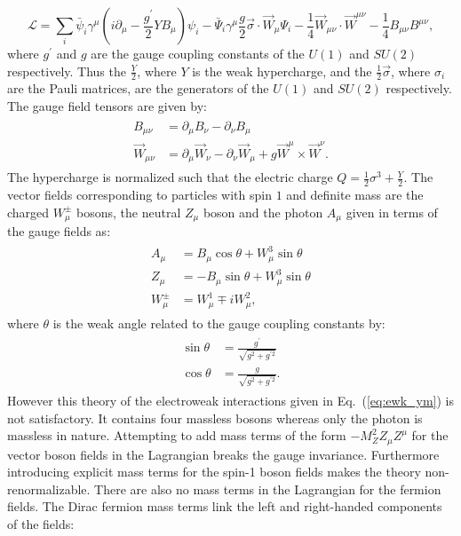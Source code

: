 \begin{equation} \label{eq:ewk_ym}
\mathcal{L} = \sum_{i} \bar{\psi}_{i} \gamma^{\mu}(i \partial_{\mu}-\frac{g^{'}}{2}YB_{\mu}) \psi_{i}  - \bar{\Psi}_{i}\gamma^{\mu}\frac{g}{2}\vec{\sigma}\cdot\vec{W}_{\mu}\Psi_{i} - \frac{1}{4}\vec{W}_{\mu\nu}\cdot\vec{W}^{\mu\nu} - \frac{1}{4} B_{\mu\nu} B^{\mu\nu},
\end{equation}
where $g^{'}$ and $g$ are the gauge coupling constants of the $U(1)$ and $SU(2)$ respectively. Thus the $\frac{Y}{2}$, where $Y$ is the weak hypercharge, and the $\frac{1}{2}\vec{\sigma}$, where $\sigma_{i}$ are the Pauli matrices, are the generators of the $U(1)$ and $SU(2)$ respectively. The gauge field tensors are given by:
\begin{eqnarray} \label{eq:ewk_field}
\begin{aligned}
B_{\mu\nu} &= \partial_{\mu}B_{\nu}-\partial_{\nu}B_{\mu}  \\
\vec{W}_{\mu\nu} &=  \partial_{\mu}\vec{W}_{\nu}-\partial_{\nu}\vec{W}_{\mu} + g \vec{W}^{\mu} \times \vec{W}^{\nu}.
\end{aligned}
\end{eqnarray}
The hypercharge is normalized such that the electric charge $Q=\frac{1}{2}\sigma^3+\frac{Y}{2}$. The vector fields corresponding to particles with spin $1$ and definite mass are the charged $W^{\pm}_{\mu}$ bosons, the neutral $Z_{\mu}$ boson and the photon $A_{\mu}$ given in terms of the gauge fields as: 
\begin{eqnarray} \label{eq:bosons}
\begin{aligned}
A_{\mu} &= B_{\mu} \cos \theta + W_{\mu}^{3} \sin \theta \\
Z_{\mu} &= -B_{\mu} \sin \theta + W_{\mu}^{3} \sin \theta \\
W_{\mu}^{\pm} &= W^{1}_{\mu} \mp i W_{\mu}^{2},
\end{aligned}
\end{eqnarray}
where $\theta$ is the weak angle related to the gauge coupling constants by:
\begin{eqnarray} \label{eq:coupling}
\begin{aligned}
\sin \theta &= \frac{g^{'}}{\sqrt{g^2+g^{'2}}} \\
\cos \theta &= \frac{g}{\sqrt{g^2+g^{'2}}}.
\end{aligned}
\end{eqnarray}
However this theory of the electroweak interactions given in Eq.~(\ref{eq:ewk_ym}) is not satisfactory. It contains four massless bosons whereas only the photon is massless in nature. Attempting to add mass terms of the form $-M_{Z}^2Z_{\mu}Z^{\mu}$ for the vector boson fields in the Lagrangian breaks the gauge invariance. Furthermore introducing explicit mass terms for the spin-1 boson fields makes the theory non-renormalizable. There are also no mass terms in the Lagrangian for the fermion fields.  The Dirac fermion mass terms link the left and right-handed components of the fields:
